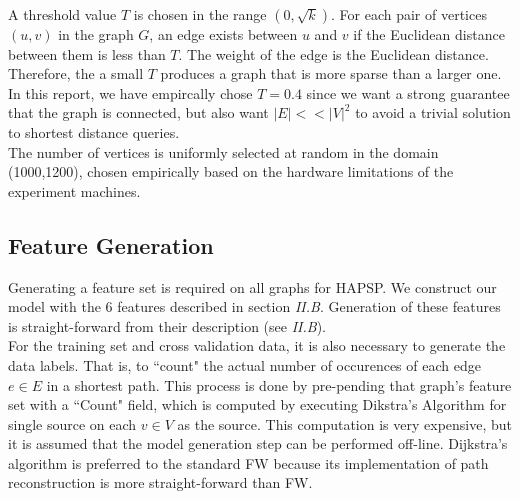 \documentclass[10.5pt,journal]{IEEEtran}
\begin{document}
		A threshold value $T$ is chosen in the range $(0,\sqrt{k})$. For each pair of vertices $(u,v)$ in
		the graph $G$, an edge exists between $u$ and $v$ if the Euclidean distance between them is less
		than $T$. The weight of the edge is the Euclidean distance. Therefore, the a small $T$ produces a
		graph that is more sparse than a larger one. In this report, we have empircally chose $T=0.4$
		since we want a strong guarantee that the graph is connected, but also want $|E| << |V|^2$ to
		avoid a trivial solution to shortest distance queries.\\
		
		The number of vertices is uniformly selected at random in the domain (1000,1200), chosen empirically
		based on the hardware limitations of the experiment machines.
		
	\subsection{Feature Generation}
		Generating a feature set is required on all graphs for HAPSP. We construct our model with the 6
		features described in section {\it{II.B}}. Generation of these features is straight-forward from
		their description (see {\it{II.B}}). \\
		
		For the training set and cross validation data, it is also necessary to generate the data labels.
		That is, to ``count" the actual number of occurences of each edge $e \in E$ in a shortest path.
		This process is done by pre-pending that graph's feature set with a ``Count" field, which is
		computed by executing Dikstra's Algorithm for single source on each $v\in V$ as the source. 
		This computation is very expensive, but it is assumed that the model generation step can be
		performed off-line. Dijkstra's algorithm is preferred to the standard FW because its implementation
		of path reconstruction is more straight-forward than FW.
		
\end{document}
